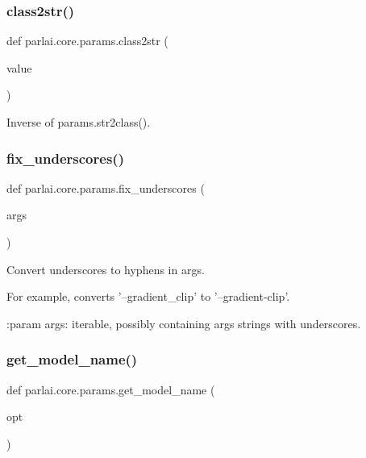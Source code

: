 \subsubsection{\texorpdfstring{class2str()}{class2str()}}
{\footnotesize\ttfamily def parlai.\+core.\+params.\+class2str (\begin{DoxyParamCaption}\item[{}]{value }\end{DoxyParamCaption})}

\begin{DoxyVerb}Inverse of params.str2class().
\end{DoxyVerb}
 \mbox{\label{namespaceparlai_1_1core_1_1params_afe2837a1dc21017be30cc7e3cb3696b8}} 
\subsubsection{\texorpdfstring{fix\+\_\+underscores()}{fix\_underscores()}}
{\footnotesize\ttfamily def parlai.\+core.\+params.\+fix\+\_\+underscores (\begin{DoxyParamCaption}\item[{}]{args }\end{DoxyParamCaption})}

\begin{DoxyVerb}Convert underscores to hyphens in args.

For example, converts '--gradient_clip' to '--gradient-clip'.

:param args: iterable, possibly containing args strings with underscores.
\end{DoxyVerb}
 \mbox{\label{namespaceparlai_1_1core_1_1params_a6d160324f6af84562334fd0698141074}} 
\subsubsection{\texorpdfstring{get\+\_\+model\+\_\+name()}{get\_model\_name()}}
{\footnotesize\ttfamily def parlai.\+core.\+params.\+get\+\_\+model\+\_\+name (\begin{DoxyParamCaption}\item[{}]{opt }\end{DoxyParamCaption})}

